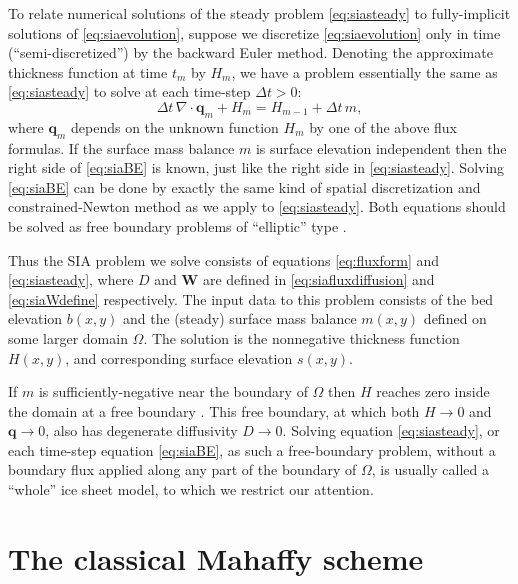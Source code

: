 \documentclass[twocolumn]{igs}
\newcommand\bq{\mathbf{q}}
\newcommand\bW{\mathbf{W}}
\newcommand{\Div}{\nabla\cdot}
\begin{document}
To relate numerical solutions of the steady problem \eqref{eq:siasteady} to fully-implicit  solutions of \eqref{eq:siaevolution}, suppose we discretize \eqref{eq:siaevolution} only in time (``semi-discretized'') by the backward Euler method.  Denoting the approximate thickness function at time $t_m$ by $H_m$, we have a problem essentially the same as \eqref{eq:siasteady} to solve at each time-step $\Delta t> 0$:
\begin{equation}
\Delta t\,\Div \bq_m + H_m = H_{m-1} + \Delta t\,m,  \label{eq:siaBE}
\end{equation}
where $\bq_m$ depends on the unknown function $H_m$ by one of the above flux formulas.  If the surface mass balance $m$ is surface elevation independent then the right side of \eqref{eq:siaBE} is known, just like the right side in \eqref{eq:siasteady}.  Solving \eqref{eq:siaBE} can be done by exactly the same kind of spatial discretization and constrained-Newton method as we apply to \eqref{eq:siasteady}.  Both equations should be solved as free boundary problems of ``elliptic'' type \citep{JouvetBueler2012}.

Thus the SIA problem we solve consists of equations \eqref{eq:fluxform} and \eqref{eq:siasteady}, where $D$ and $\bW$ are defined in \eqref{eq:siafluxdiffusion} and \eqref{eq:siaWdefine} respectively.  The input data to this problem consists of the bed elevation $b(x,y)$ and the (steady) surface mass balance $m(x,y)$ defined on some larger domain $\Omega$.  The solution is the nonnegative thickness function $H(x,y)$, and corresponding surface elevation $s(x,y)$.

If $m$ is sufficiently-negative near the boundary of $\Omega$ then $H$ reaches zero inside the domain at a free boundary \citep{JouvetBueler2012}.  This free boundary, at which both $H\to 0$ and $\bq \to 0$, also has degenerate diffusivity $D \to 0$.  Solving equation \eqref{eq:siasteady}, or each time-step equation \eqref{eq:siaBE}, as such a free-boundary problem, without a boundary flux applied along any part of the boundary of $\Omega$, is usually called a ``whole'' ice sheet model, to which we restrict our attention.


\section{The classical Mahaffy scheme}   \label{sec:mahaffyfd}
\end{document}
